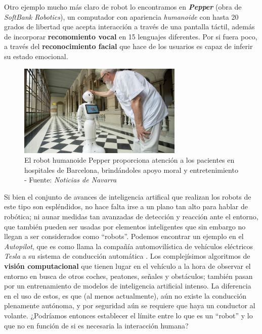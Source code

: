 Otro ejemplo mucho más claro de robot lo encontramos en \textbf{\textit{Pepper}} \cite{pepper-robot} (obra de \textit{SoftBank Robotics}), un computador con apariencia \textit{humanoide} con hasta 20 grados de libertad que acepta interacción a través de una pantalla táctil, además de incorporar \textbf{reconomiento vocal} en 15 lenguajes diferentes. Por si fuera poco, a través del \textbf{reconocimiento facial} que hace de los usuarios es capaz de inferir su estado emocional.\\

\begin{figure}[h]
	\centering
	\includegraphics[width=0.7\textwidth]{imagenes/pepper-hospital.jpg}
	\caption{El robot humanoide Pepper proporciona atención a los pacientes en hospitales de Barcelona, brindándoles apoyo moral y entretenimiento - Fuente: \textit{Noticias de Navarra} \cite{pepper-noticias}}
	\label{pepper-hospital}
\end{figure}

Si bien el conjunto de avances de inteligencia artifical que realizan los robots de este tipo son espléndidos, no hace falta irse a un plano tan alto para hablar de robótica; ni aunar medidas tan avanzadas de detección y reacción ante el entorno, que también pueden ser usadas por elementos inteligentes que sin embargo no llegan a ser considerados como ``robots''. Podemos encontrar un ejemplo en el \textit{Autopilot}, que es como llama la compañía automovilística de vehículos eléctricos \textit{Tesla} a su sistema de conducción automática \cite{tesla-ai}. Los complejísimos algoritmos de \textbf{visión computacional} que tienen lugar en el vehículo a la hora de observar el entorno en busca de otros coches, peatones, señales y obstáculos; también pasan por un entrenamiento de modelos de inteligencia artificial intenso. La diferencia en el uso de estos, es que (al menos actualmente), aún no existe la conducción plenamente autónoma, y por seguridad aún se requiere que haya un conductor al volante. ¿Podríamos entonces establecer el límite entre lo que es un ``robot'' y lo que no en función de si es necesaria la interacción humana?\\

